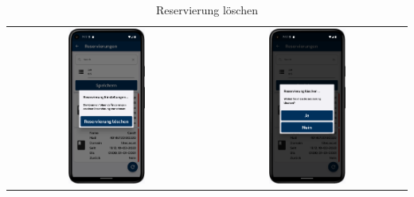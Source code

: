 \vspace{1cm}
\begin{table}[htbp]
  \centering
  \begin{tabular}{cc}
    \includegraphics[width=0.4\textwidth]{FLUTTER/images/ZB/reservation_page_selector.png} &
    \includegraphics[width=0.4\textwidth]{FLUTTER/images/ZB/reservation_delete.png} \\
  \end{tabular}
  \label{tab:example}
  \captionsetup{type=figure}
  \caption{Reservierung löschen}
\end{table}

